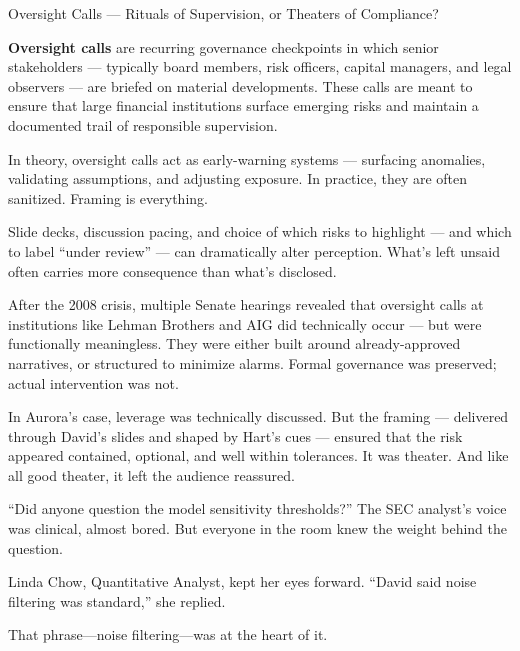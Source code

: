 \begin{TechnicalSidebar}{Oversight Calls — Rituals of Supervision, or Theaters of Compliance?}

  \textbf{Oversight calls} are recurring governance checkpoints in which senior stakeholders — typically board 
  members, risk officers, capital managers, and legal observers — are briefed on material developments. These 
  calls are meant to ensure that large financial institutions surface emerging risks and maintain a documented 
  trail of responsible supervision.

  \medskip
  
  In theory, oversight calls act as early-warning systems — surfacing anomalies, validating assumptions, and 
  adjusting exposure. In practice, they are often sanitized. Framing is everything.

  \medskip
  
  Slide decks, discussion pacing, and choice of which risks to highlight — and which to label ``under review'' — 
  can dramatically alter perception. What’s left unsaid often carries more consequence than what’s disclosed.

  \medskip
  
  After the 2008 crisis, multiple Senate hearings revealed that oversight calls at institutions like Lehman 
  Brothers and AIG did technically occur — but were functionally meaningless. They were either built around 
  already-approved narratives, or structured to minimize alarms. Formal governance was preserved; actual 
  intervention was not.

  \medskip
  
  In Aurora’s case, leverage was technically discussed. But the framing — delivered through David’s slides 
  and shaped by Hart’s cues — ensured that the risk appeared contained, optional, and well within tolerances. 
  It was theater. And like all good theater, it left the audience reassured.
  
\end{TechnicalSidebar}


\medskip

“Did anyone question the model sensitivity thresholds?”
The SEC analyst’s voice was clinical, almost bored.
But everyone in the room knew the weight behind the question.

Linda Chow, Quantitative Analyst, kept her eyes forward.
“David said noise filtering was standard,” she replied.

That phrase—noise filtering—was at the heart of it.

